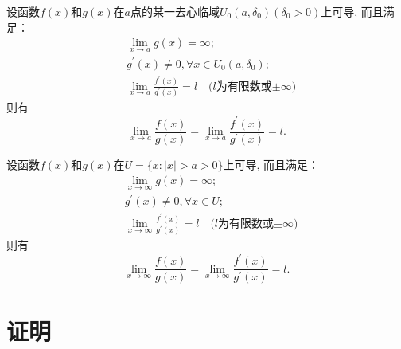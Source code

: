 \documentclass{ctexart}
\begin{document}
\begin{theorem}\label{theorem3}
    设函数$f(x)$和$g(x)$在$a$点的某一去心临域$U_0(a, \delta_0)(\delta_0>0)$上可导, 而且满足：
    \begin{align}
        \label{condition3. 1}
        &\lim\limits_{x\rightarrow a}g(x)=\infty;\\ 
        \label{condition3. 2}
        &g^{'}(x)\not=0, \forall x\in U_0(a, \delta_0);\\ 
        \label{condition3. 3}
        &\lim\limits_{x\rightarrow a}\frac{f^{'}(x)}{g^{'}(x)}=l\quad \text{($l$为有限数或$\pm\infty$)}
    \end{align}
    则有
    \begin{equation}\label{conclusion3}
        \lim_{x\rightarrow a}\frac{f(x)}{g(x)}=\lim_{x\rightarrow a}\frac{f^{'}(x)}{g^{'}(x)}=l.
    \end{equation}
\end{theorem}
\begin{theorem}\label{theorem4}
    设函数$f(x)$和$g(x)$在$U=\{x:|x|>a>0\}$上可导, 而且满足：
    \begin{align}
        \label{condition4. 1}
        &\lim\limits_{x\rightarrow \infty}g(x)=\infty;\\ 
        \label{condition4. 2}
        &g^{'}(x)\not=0, \forall x\in U;\\ 
        \label{condition4. 3}
        &\lim\limits_{x\rightarrow \infty}\frac{f^{'}(x)}{g^{'}(x)}=l\quad \text{($l$为有限数或$\pm\infty$)}
    \end{align}
    则有
    \begin{equation}\label{conclusion4}
        \lim_{x\rightarrow \infty}\frac{f(x)}{g(x)}=\lim_{x\rightarrow \infty}\frac{f^{'}(x)}{g^{'}(x)}=l.
    \end{equation}
\end{theorem}
\section{证明}
\end{document}
